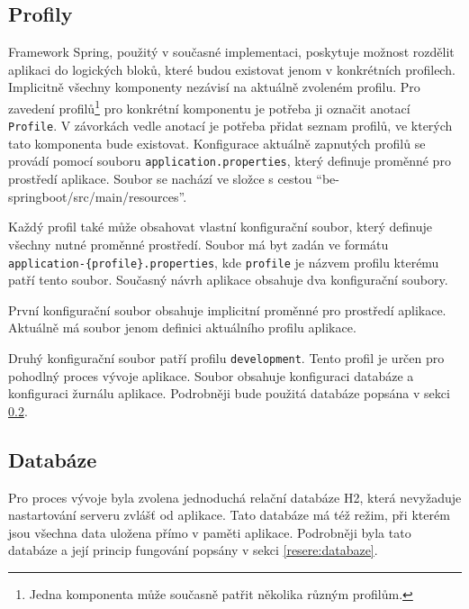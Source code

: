     \subsection{Profily}\label{analyza:soucasnaImplementace:profily}
        Framework Spring, použitý v současné implementaci, poskytuje možnost rozdělit aplikaci do logických bloků, které budou existovat jenom v konkrétních profilech\cite{spring-profile}. Implicitně všechny komponenty nezávisí na aktuálně zvoleném profilu. Pro zavedení profilů\footnote{Jedna komponenta může současně patřit několika různým profilům.} pro konkrétní komponentu je potřeba ji označit anotací \texttt{Profile}. V závorkách vedle anotací je potřeba přidat seznam profilů, ve kterých tato komponenta bude existovat. Konfigurace aktuálně zapnutých profilů se provádí pomocí souboru \texttt{application.properties}, který definuje proměnné pro prostředí aplikace. Soubor se nachází ve složce s cestou \enquote{be-springboot/src/main/resources}.
    
        Každý profil také může obsahovat vlastní konfigurační soubor, který definuje všechny nutné proměnné prostředí. Soubor má byt zadán ve formátu \texttt{application-\{profile\}.properties}, kde \texttt{profile} je názvem profilu kterému patří tento soubor. Současný návrh aplikace obsahuje dva konfigurační soubory.
    
        První konfigurační soubor obsahuje implicitní proměnné pro prostředí aplikace. Aktuálně má soubor jenom definici aktuálního profilu aplikace. 
    
        Druhý konfigurační soubor patří profilu \texttt{development}. Tento profil je určen pro pohodlný proces vývoje aplikace. Soubor obsahuje konfiguraci databáze a konfiguraci žurnálu aplikace. Podrobněji bude použitá databáze popsána v sekci \ref{analyza:soucasnaImplementace:databaze}.
        
    \subsection{Databáze}\label{analyza:soucasnaImplementace:databaze}
        Pro proces vývoje byla zvolena jednoduchá relační databáze H2, která nevyžaduje nastartování serveru zvlášť od aplikace. Tato databáze má též režim, při kterém jsou všechna data uložena přímo v paměti aplikace. Podrobněji byla tato databáze a její princip fungování popsány v sekci \ref{resere:databaze}.
    
